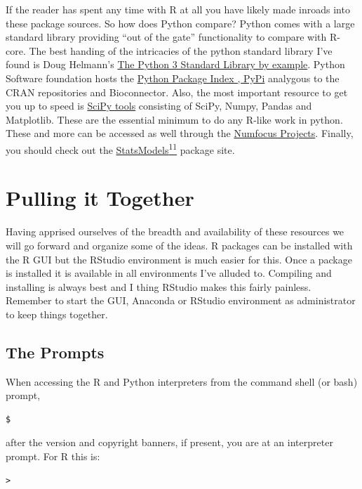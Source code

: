 \documentclass[]{book}
\theoremstyle{definition}
\theoremstyle{definition}
\theoremstyle{definition}
\theoremstyle{remark}
\begin{document}
If the reader has spent any time with R at all you have likely made
inroads into these package sources. So how does Python compare? Python
comes with a large standard library providing ``out of the gate''
functionality to compare with R-core. The best handing of the
intricacies of the python standard library I've found is Doug Helmann's
\href{https://amazon.com/Python-Standard-Library-Example-Developers/dp/0134291050/}{The
Python 3 Standard Library by example}. Python Software foundation hosts
the \href{https://pypi.org/}{Python Package Index , PyPi} analygous to
the CRAN repositories and Bioconnector. Also, the most important
resource to get you up to speed is \href{https://www.scipy.org/}{SciPy
tools} consisting of SciPy, Numpy, Pandas and Matplotlib. These are the
essential minimum to do any R-like work in python. These and more can be
accessed as well through the
\href{https://numfocus.org/sponsored-projects}{Numfocus Projects}.
Finally, you should check out the
\href{https://www.statsmodels.org/stable/index.html}{StatsModels\textsuperscript{11}}
package site.

\section{Pulling it Together}\label{pulling-it-together}

Having apprised ourselves of the breadth and availability of these
resources we will go forward and organize some of the ideas. R packages
can be installed with the R GUI but the RStudio environment is much
easier for this. Once a package is installed it is available in all
environments I've alluded to. Compiling and installing is always best
and I thing RStudio makes this fairly painless. Remember to start the
GUI, Anaconda or RStudio environment as administrator to keep things
together.

\subsection{The Prompts}\label{the-prompts}

When accessing the R and Python interpreters from the command shell (or
bash) prompt,

\begin{verbatim}
$
\end{verbatim}

after the version and copyright banners, if present, you are at an
interpreter prompt. For R this is:

\begin{verbatim}
>
\end{verbatim}
\end{document}
